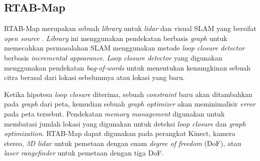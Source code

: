 \subsection{RTAB-Map}
\label{subsec:rtabmap}

RTAB-Map merupakan sebuah \emph{library} untuk \emph{lidar} dan visual SLAM yang bersifat \emph{open source} \citep{cit:labbe2019}.
\emph{Library} ini menggunakan pendekatan berbasis \emph{graph} untuk memecahkan permasalahan SLAM menggunakan metode \emph{loop closure detector} berbasis \emph{incremental appearance}.
\emph{Loop closure detector} yang digunakan menggunakan pendekatan \emph{bag-of-words} untuk menentukan kemungkinan sebuah citra berasal dari lokasi sebelumnya atau lokasi yang baru.

Ketika hipotesa \emph{loop closure} diterima,
  sebuah \emph{constraint} baru akan ditambahkan pada \emph{graph} dari peta,
  kemudian sebuah \emph{graph optimizer} akan meminimalisir \emph{error} pada peta tersebut.
Pendekatan \emph{memory management} digunakan untuk membatasi jumlah lokasi yang digunakan untuk deteksi \emph{loop closure} dan \emph{graph optimization}.
RTAB-Map dapat digunakan pada perangkat Kinect,
  kamera stereo,
  \emph{3D lidar} untuk pemetaan dengan enam \emph{degree of freedom} (DoF),
  atau \emph{laser rangefinder} untuk pemetaan dengan tiga DoF.
